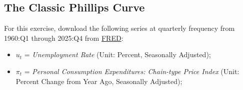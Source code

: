 \documentclass[dvipsnames,11pt]{article}
\begin{document}
    \subsection{The Classic Phillips Curve}

        For this exercise, download the following series at quarterly frequency from 1960:Q1 through 2025:Q4 from \href{https://fred.stlouisfed.org}{FRED}:
        \begin{itemize}
            \item $u_t$ = \textit{Unemployment Rate} (Unit: Percent, Seasonally Adjusted);
            
            \item $\pi_t$ = \textit{Personal Consumption Expenditures: Chain-type Price Index} (Unit: Percent Change from Year Ago, Seasonally Adjusted);
        \end{itemize}
        
\end{document}
